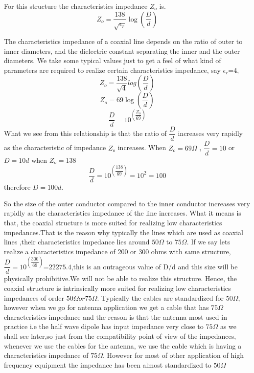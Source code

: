 For this structure the characteristics impedance $Z_o$ is.
\begin{equation*}
Z_o=\dfrac{138}{\sqrt{\epsilon_r}}\log(\dfrac{D}{d})
\end{equation*}

The characteristics impedance of a coaxial line depends on the ratio of outer to inner diameters, and the dielectric constant separating the inner and the outer diameters.
We take some typical values just to get a feel of what kind of parameters are required to realize certain characteristics impedance, say $\epsilon_r$=4, $$Z_o=\dfrac{138}{\sqrt{4}}log(\dfrac{D}{d})$$ $$Z_o=69\log(\dfrac{D}{d})$$ $$\dfrac{D}{d}=10^{(\dfrac{Z_o}{69})}$$
What we see from this relationship is that the ratio of $\dfrac{D}{d}$  increases very rapidly as the characteristic of impedance $Z_o$ increases. When $Z_o=69\varOmega$ , $\dfrac{D}{d}=10$ or  $D=10d$ when $Z_o = 138$
\begin{dmath*}
\dfrac{D}{d}=10^{(\dfrac{138}{69})}=10^{2}=100
\end{dmath*}
therefore $D=100d$.

So the size of the outer conductor compared to the inner conductor increases very rapidly as the characteristics impedance of the line increases. What it means is that, the coaxial structure is more suited for realizing low characteristics impedances.That is the reason why typically the lines which are used as coaxial lines ,their characteristics impedance lies around $50\Omega$ to $75\Omega$. If we say lets realize a characteristics impedance of 200 or 300 ohms with same structure, $\dfrac{D}{d}=10^{(\dfrac{300}{69})}$=$22275.4$,this is an outrageous value of D/d and this size will be physically prohibitive.We will not be able to realize this structure. Hence, the coaxial structure is intrinsically more suited for realizing low characteristics impedances of order $50\Omega or 75\Omega$. Typically the cables are standardized for $50\Omega$, however when we go for antenna application we get a cable that has $75\Omega$ characteristics impedance  and the reason is that the antenna most used in practice i.e the half wave dipole has input impedance very close to $75\Omega$ as we shall see later,so just from the compatibility point of view of the impedances, whenever we use the cables for the antenna, we use the cable which is having a characteristics impedance of $75\Omega$. However for most of other application of high frequency equipment the impedance has been almost standardized to $50\Omega$

